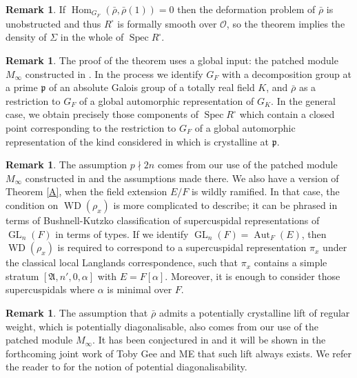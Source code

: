 \documentclass[11pt]{article}
\let\mathcal\mathscr
\newcommand{\ssquare}{{\scriptscriptstyle\square}}
\theoremstyle{definition}
\newtheorem{remark}[prop]{Remark}
\DeclareMathOperator{\Aut}{Aut}
\DeclareMathOperator{\Hom}{Hom}
\DeclareMathOperator{\GL}{GL}
\DeclareMathOperator{\WD}{WD}
\DeclareMathOperator{\Spec}{Spec}
\newcommand{\cO}{\mathcal{O}}
\newcommand{\pp}{\mathfrak p}
\newcommand{\rhobar}{\bar{\rho}}
\begin{document}
\begin{remark} If $\Hom_{G_F}(\rhobar, \rhobar(1))=0$ then the deformation problem of $\rhobar$ is unobstructed and thus $R^\ssquare$ is formally smooth over $\cO$, so the theorem
implies the density of $\Sigma$ in the whole of $\Spec R^\ssquare$.
\end{remark}

\begin{remark} The proof of the theorem uses a global input: the patched module $M_\infty$ constructed in
\cite{six-authors}. In the process we identify $G_F$ with a decomposition group at a prime $\pp$ of an absolute Galois group of a totally real field $K$, and $\rhobar$ as a restriction to $G_F$ of a global automorphic representation of $G_K$. In the general case, we obtain precisely those components of $\Spec R^\ssquare$ which contain a closed point corresponding to the restriction to $G_F$
of a global automorphic representation of the kind considered in \cite[\S 2.4]{six-authors} which is crystalline at $\pp$.
\end{remark}

\begin{remark} The assumption $p \nmid 2n$ comes from our use of the patched
module $M_{\infty}$ constructed in \cite{six-authors} and the assumptions made there. We also have a version of Theorem \ref{A}, when the field extension $E/F$ is wildly ramified. In that case, the condition on $\WD(\rho_x)$ is more complicated to describe; it can be phrased in terms of Bushnell-Kutzko classification of supercuspidal representations of
$\GL_n(F)$ in terms of types. If we identify $\GL_n(F)=\Aut_F(E)$, then $\WD(\rho_x)$ is required to correspond to a supercuspidal representation $\pi_x$ under the classical local
Langlands correspondence, such that $\pi_x$ contains a simple stratum $[\mathfrak A, n', 0, \alpha]$ with $E=F[\alpha]$. Moreover, it is enough to consider those supercuspidals where $\alpha$ is minimal over $F$.
\end{remark}

\begin{remark}\label{vac} The assumption that $\rhobar$ admits a potentially crystalline lift of regular weight, which is
potentially diagonalisable, also comes from our use of the patched module $M_{\infty}$. It has been conjectured in \cite{BMcycles} and it will be shown in the forthcoming joint work of Toby Gee and ME that such lift always exists. We refer the reader to \cite[\S 1.4]{BLGGT} for the notion of potential diagonalisability.
\end{remark}
\end{document}
